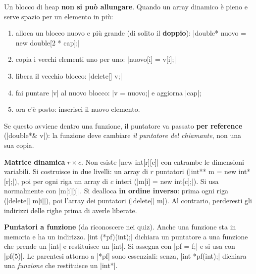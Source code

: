 \begin{passopasso}
Un blocco di heap \textbf{non si può allungare}. Quando un array dinamico è
pieno e serve spazio per un elemento in più:
\begin{enumerate}
  \item alloca un blocco nuovo e più grande (di solito il \textbf{doppio}):
        \cc|double* nuovo = new double[2 * cap];|
  \item copia i vecchi elementi uno per uno: \cc|nuovo[i] = v[i];|
  \item libera il vecchio blocco: \cc|delete[] v;|
  \item fai puntare \cc|v| al nuovo blocco: \cc|v = nuovo;| e aggiorna \cc|cap|;
  \item ora c'è posto: inserisci il nuovo elemento.
\end{enumerate}
Se questo avviene dentro una funzione, il puntatore va passato \textbf{per
reference} (\cc|double*& v|): la funzione deve cambiare \emph{il puntatore del
chiamante}, non una sua copia.
\end{passopasso}

\textbf{Matrice dinamica} $r \times c$. Non esiste \cc|new int[r][c]| con
entrambe le dimensioni variabili. Si costruisce in due livelli: un array di
$r$ puntatori (\cc|int** m = new int*[r];|), poi per ogni riga un array di $c$
interi (\cc|m[i] = new int[c];|). Si usa normalmente con \cc|m[i][j]|.
Si dealloca \textbf{in ordine inverso}: prima ogni riga (\cc|delete[] m[i]|),
poi l'array dei puntatori (\cc|delete[] m|). Al contrario, perderesti gli
indirizzi delle righe prima di averle liberate.

\textbf{Puntatori a funzione} (da riconoscere nei quiz). Anche una funzione sta
in memoria e ha un indirizzo. \cc|int (*pf)(int);| dichiara un puntatore a una
funzione che prende un \cc|int| e restituisce un \cc|int|. Si assegna con
\cc|pf = f;| e si usa con \cc|pf(5)|. Le parentesi attorno a \cc|*pf| sono
essenziali: senza, \cc|int *pf(int);| dichiara una \emph{funzione} che
restituisce un \cc|int*|.

